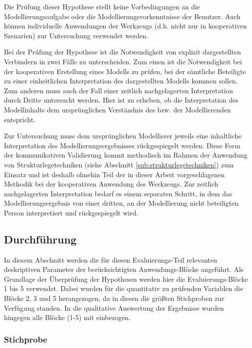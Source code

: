 Die Prüfung dieser Hypothese stellt keine Vorbedingungen an die Modellierungsaufgabe oder die Modellierungsvorkenntnisse der Benutzer. Auch können individuelle Anwendungen der Werkzeugs (d.h. nicht nur in kooperativen Szenarien) zur Untersuchung verwendet werden. 

Bei der Prüfung der Hypothese ist die Notwendigkeit von explizit dargestellten Verbindern in zwei Fälle zu unterscheiden. Zum einen ist die Notwendigkeit bei der kooperativen Erstellung eines Modells zu prüfen, bei der sämtliche Beteiligte zu einer einheitlichen Interpretation des dargestellten Modells kommen sollen. Zum anderen muss auch der Fall einer zeitlich nachgelagerten Interpretation durch Dritte untersucht werden. Hier ist zu erheben, ob die Interpretation des Modellinhalts dem ursprünglichen Verständnis des bzw. der Modellierenden entspricht.

Zur Untersuchung muss dem ursprünglichen Modellierer jeweils eine inhaltliche Interpretation des Modellierungsergebnisses rückgespiegelt werden. Diese Form der kommunikativen Validierung kommt methodisch im Rahmen der Anwendung von Strukturlegetechniken (siehe Abschnitt \ref{sub:strukturlegetechniken}) zum Einsatz und ist deshalb ohnehin Teil der in dieser Arbeit vorgeschlagenen Methodik bei der kooperativen Anwendung des Werkzeugs. Zur zeitlich nachgelagerten Interpretation bedarf es einem separaten Schritt, in dem das Modellierungsergebnis von einer dritten, an der Modellierung nicht beteiligten Person interpretiert und rückgespiegelt wird. 


\subsection{Durchführung} %
\label{sub:m_durchführung}

In diesem Abschnitt werden die für diesen Evaluierungs-Teil relevanten deskriptiven Parameter der berücksichtigten Anwendungs-Blöcke angeführt.
Als Grundlage der Überprüfung der Hypothesen werden hier die Evaluierungs-Blöcke 1 bis 5 verwendet. Dabei wurden für die quantitativ zu prüfenden Variablen die Blöcke 2, 3 und 5 herangezogen, da in diesen die größten Stichproben zur Verfügung standen. In die qualitative Auswertung der Ergebnisse wurden hingegen alle Blöcke (1-5) mit einbezogen.

\subsubsection{Stichprobe} %
\label{ssub:stichprobe}

